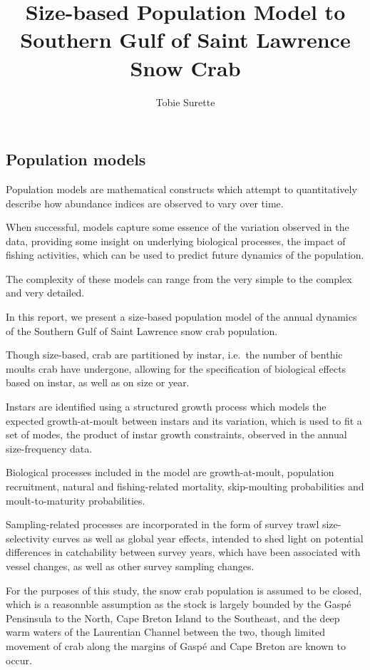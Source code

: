 \documentclass[
]{article}
\title{Size-based Population Model to Southern Gulf of Saint Lawrence Snow Crab}
\author{Tobie Surette}
\date{}
\begin{document}
\maketitle

\hypertarget{population-models}{%
\subsection{Population models}\label{population-models}}

Population models are mathematical constructs which attempt to
quantitatively describe how abundance indices are observed to vary over
time.

When successful, models capture some essence of the variation observed
in the data, providing some insight on underlying biological processes,
the impact of fishing activities, which can be used to predict future
dynamics of the population.

The complexity of these models can range from the very simple to the
complex and very detailed.

In this report, we present a size-based population model of the annual
dynamics of the Southern Gulf of Saint Lawrence snow crab population.

Though size-based, crab are partitioned by instar, i.e.~the number of
benthic moults crab have undergone, allowing for the specification of
biological effects based on instar, as well as on size or year.

Instars are identified using a structured growth process which models
the expected growth-at-moult between instars and its variation, which is
used to fit a set of modes, the product of instar growth constraints,
observed in the annual size-frequency data.

Biological processes included in the model are growth-at-moult,
population recruitment, natural and fishing-related mortality,
skip-moulting probabilities and moult-to-maturity probabilities.

Sampling-related processes are incorporated in the form of survey trawl
size-selectivity curves as well as global year effects, intended to shed
light on potential differences in catchability between survey years,
which have been associated with vessel changes, as well as other survey
sampling changes.

For the purposes of this study, the snow crab population is assumed to
be closed, which is a reasonnble assumption as the stock is largely
bounded by the Gaspé Pensinsula to the North, Cape Breton Island to the
Southeast, and the deep warm waters of the Laurentian Channel between
the two, though limited movement of crab along the margins of Gaspé and
Cape Breton are known to occur.
\end{document}
